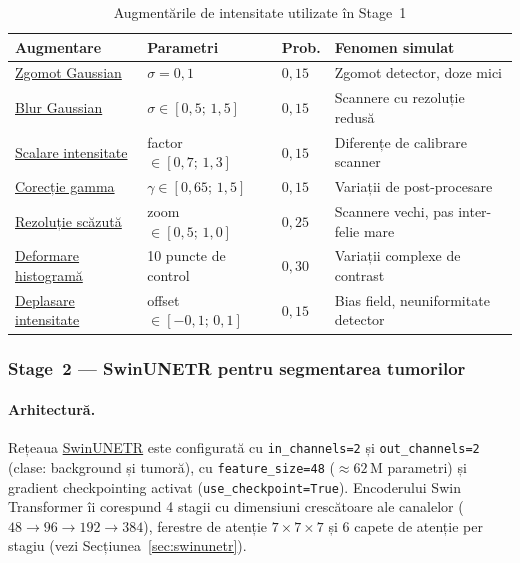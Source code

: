\documentclass[12pt, a4paper]{report}
\begin{document}
\begin{table}[H]
    \centering
    \caption{Augmentările de intensitate utilizate în Stage~1}
    \label{tab:aug_intensitate_s1}
    \begin{tabular}{llll}
        \toprule
        \textbf{Augmentare} & \textbf{Parametri} &
        \textbf{Prob.} & \textbf{Fenomen simulat} \\
        \midrule
        \hyperref[sec:gaussnoise]{Zgomot Gaussian}
            & $\sigma = 0{,}1$
            & $0{,}15$
            & Zgomot detector, doze mici \\
        \hyperref[sec:gausssmooth]{Blur Gaussian}
            & $\sigma \in [0{,}5;\, 1{,}5]$
            & $0{,}15$
            & Scannere cu rezoluție redusă \\
        \hyperref[sec:scaleintensity]{Scalare intensitate}
            & factor $\in [0{,}7;\, 1{,}3]$
            & $0{,}15$
            & Diferențe de calibrare scanner \\
        \hyperref[sec:adjustcontrast]{Corecție gamma}
            & $\gamma \in [0{,}65;\, 1{,}5]$
            & $0{,}15$
            & Variații de post-procesare \\
        \hyperref[sec:lowres]{Rezoluție scăzută}
            & zoom $\in [0{,}5;\, 1{,}0]$
            & $0{,}25$
            & Scannere vechi, pas inter-felie mare \\
        \hyperref[sec:histshift]{Deformare histogramă}
            & 10 puncte de control
            & $0{,}30$
            & Variații complexe de contrast \\
        \hyperref[sec:shiftintensity]{Deplasare intensitate}
            & offset $\in [-0{,}1;\, 0{,}1]$
            & $0{,}15$
            & Bias field, neuniformitate detector \\
        \bottomrule
    \end{tabular}
\end{table}


\subsubsection{Stage~2 — SwinUNETR pentru segmentarea tumorilor}

\paragraph{Arhitectură.}
Rețeaua \hyperref[sec:swinunetr]{SwinUNETR} este configurată cu
\texttt{in\_channels=2} și \texttt{out\_channels=2}
(clase: background și tumoră), cu \texttt{feature\_size=48}
($\approx 62$\,M parametri) și gradient checkpointing activat
(\texttt{use\_checkpoint=True}).
Encoderului Swin Transformer îi corespund 4 stagii cu dimensiuni
crescătoare ale canalelor ($48 \to 96 \to 192 \to 384$), ferestre
de atenție $7 \times 7 \times 7$ și 6 capete de atenție per stagiu
(vezi Secțiunea~\ref{sec:swinunetr}).
\end{document}
